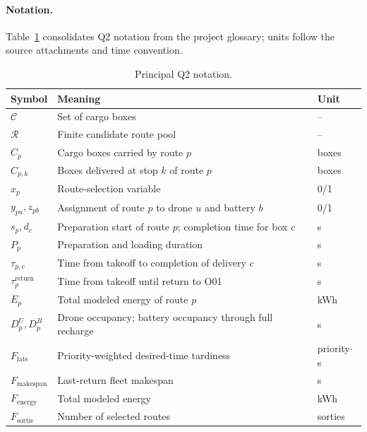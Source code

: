 \paragraph{Notation.} Table~\ref{tab:q2-notation} consolidates Q2 notation from the project glossary; units follow the source attachments and time convention.
\begin{table}[H]
\centering
\caption{Principal Q2 notation.}
\label{tab:q2-notation}
\small
\begin{tabularx}{\linewidth}{@{}lXl@{}}
\toprule
Symbol & Meaning & Unit\\
\midrule
$\mathcal C$ & Set of cargo boxes & --\\
$\mathcal R$ & Finite candidate route pool & --\\
$C_p$ & Cargo boxes carried by route $p$ & boxes\\
$C_{p,k}$ & Boxes delivered at stop $k$ of route $p$ & boxes\\
$x_p$ & Route-selection variable & 0/1\\
$y_{pu},z_{pb}$ & Assignment of route $p$ to drone $u$ and battery $b$ & 0/1\\
$s_p,d_c$ & Preparation start of route $p$; completion time for box $c$ & s\\
$P_p$ & Preparation and loading duration & s\\
$\tau_{p,c}$ & Time from takeoff to completion of delivery $c$ & s\\
$\tau_p^{\mathrm{return}}$ & Time from takeoff until return to O01 & s\\
$E_p$ & Total modeled energy of route $p$ & kWh\\
$D_p^U,D_p^B$ & Drone occupancy; battery occupancy through full recharge & s\\
$F_{\mathrm{late}}$ & Priority-weighted desired-time tardiness & priority$\cdot$s\\
$F_{\mathrm{makespan}}$ & Last-return fleet makespan & s\\
$F_{\mathrm{energy}}$ & Total modeled energy & kWh\\
$F_{\mathrm{sortie}}$ & Number of selected routes & sorties\\
\bottomrule
\end{tabularx}
\end{table}

